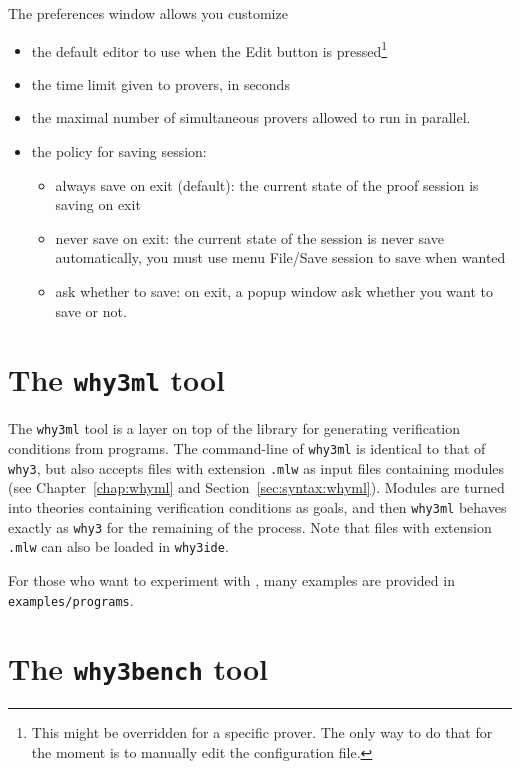 The preferences window allows you customize
\begin{itemize}
\item the default editor to use when the \textsf{Edit} button is
  pressed\footnote{This might be overridden for a specific prover. The only way
  to do that for the moment is to manually edit the configuration file.}
\item the time limit given to provers, in seconds
\item the maximal number of simultaneous provers allowed to run in parallel.
\item the policy for saving session:
  \begin{itemize}
  \item always save on exit (default): the current state of the proof session is saving on exit
  \item never save on exit: the current state of the session is never save automatically, you must use menu \textsf{File/Save session} to save when wanted
  \item ask whether to save: on exit, a popup window ask whether you
    want to save or not.
  \end{itemize}

\end{itemize}

\section{The \texttt{why3ml} tool}

The \texttt{why3ml} tool is a layer on  top of the \why library for
generating verification conditions from \whyml programs.
The command-line of \texttt{why3ml} is identical to that of
\texttt{why3}, but also accepts files with extension \texttt{.mlw} as
input files containing \whyml modules (see Chapter~\ref{chap:whyml}
and Section~\ref{sec:syntax:whyml}). Modules are turned into
theories containing verification conditions as goals, and then
\texttt{why3ml} behaves exactly as \texttt{why3} for the remaining of
the process.
Note that files with extension \texttt{.mlw} can also be loaded in
\texttt{why3ide}.

For those who want to experiment with \whyml, many examples are provided in
\texttt{examples/programs}.

\section{The \texttt{why3bench} tool}

